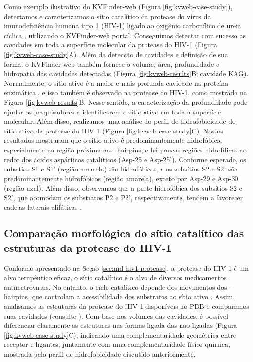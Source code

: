 \documentclass[Portugues]{phdquali}
\begin{document}
Como exemplo ilustrativo do KVFinder-web (Figura \ref{fig:kvweb-case-study}), detectamos e caracterizamos o sítio catalítico da protease do vírus da imunodeficiência humana tipo 1 (HIV-1) ligado ao oxigênio carbonílico de ureia cíclica \cite{lam1994}, utilizando o KVFinder-web portal. Conseguimos detectar com sucesso as cavidades em toda a superfície molecular da protease do HIV-1 (Figura \ref{fig:kvweb-case-study}A). Além da detecção de cavidades e definição de sua forma, o KVFinder-web também fornece o volume, área, profundidade e hidropatia das cavidades detectadas (Figura \ref{fig:kvweb-results}B; cavidade KAG). Normalmente, o sítio ativo é a maior e mais profunda cavidade na proteína enzimática \cite{laskowski1996}, e isso também é observado na protease do HIV-1, como mostrado na Figura \ref{fig:kvweb-results}B. Nesse sentido, a caracterização da profundidade pode ajudar os pesquisadores a identificarem o sítio ativo em toda a superfície molecular. Além disso, realizamos uma análise do perfil de hidrofobicidade do sítio ativo da protease do HIV-1 (Figura \ref{fig:kvweb-case-study}C). Nossos resultados mostraram que o sítio ativo é predominantemente hidrofóbico, especialmente na região próxima aos \textbeta-hairpins, e há poucas regiões hidrofílicas ao redor dos ácidos aspárticos catalíticos (Asp-25 e Asp-25'). Conforme esperado, os subsítios S1 e S1' (região amarela) são hidrofóbicos, e os subsítios S2 e S2' são predominantemente hidrofóbicos (região amarela), exceto por Asp-29 e Asp-30 (região azul). Além disso, observamos que a parte hidrofóbica dos subsítios S2 e S2', que acomodam os substratos P2 e P2', respectivamente, tendem a favorecer cadeias laterais alifáticas \cite{lam1994,brik2002,weber2009}.

\subsection{Comparação morfológica do sítio catalítico das estruturas da protease do HIV-1}

Conforme apresentado na Seção \ref{sec:md-hiv1-protease}, a protease do HIV-1 é um alvo terapêutico eficaz, o sítio catalítico é o alvo de diversos medicamentos antirretrovirais. No entanto, o ciclo catalítico depende dos movimentos dos \textbeta-hairpins, que controlam a acessibilidade dos substratos ao sítio ativo \cite{lam1994,soares2016}. Assim, analisamos as estruturas da protease do HIV-1 disponíveis no PDB e comparamos suas cavidades (consulte \cite{guerra2023A}). Com base nos volumes das cavidades, é possível diferenciar claramente as estruturas nas formas ligada das não-ligadas (Figura \ref{fig:kvweb-case-study}C), indicando uma complementaridade geométrica entre receptor e ligantes, juntamente com uma complementaridade físico-química, mostrada pelo perfil de hidrofobicidade discutido anteriormente.
\end{document}

